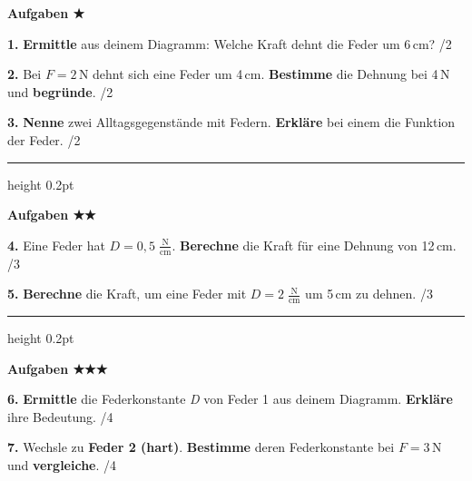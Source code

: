 \documentclass[10pt,a4paper]{article}
\newcommand{\punkte}[1]{\hfill\textcolor{grau}{\small/#1}}
\newcommand{\stern}[1]{\textcolor{physik}{\textbf{#1}}}
\newcommand{\fv}[1]{\textit{#1}}
\newcommand{\op}[1]{\textbf{#1}}
\newcommand{\rechenplatz}{\vspace{24mm}}
\begin{document}
\newpage

\textbf{\textcolor{physik}{Aufgaben \stern{★}}}

\vspace{3mm}

\textbf{1.} \op{Ermittle} aus deinem Diagramm: Welche Kraft dehnt die Feder um 6\,cm? \punkte{2}

\vspace{6mm}

\textbf{2.} Bei $\fv{F} = 2$\,N dehnt sich eine Feder um 4\,cm. \op{Bestimme} die Dehnung bei 4\,N und \op{begründe}. \punkte{2}

\vspace{10mm}

\textbf{3.} \op{Nenne} zwei Alltagsgegenstände mit Federn. \op{Erkläre} bei einem die Funktion der Feder. \punkte{2}

\vspace{12mm}

\hrule height 0.2pt
\vspace{4mm}

\textbf{\textcolor{physik}{Aufgaben \stern{★★}}}

\vspace{3mm}

\textbf{4.} Eine Feder hat $\fv{D} = 0{,}5\;\frac{\text{N}}{\text{cm}}$. \op{Berechne} die Kraft für eine Dehnung von 12\,cm. \punkte{3}

\rechenplatz

\textbf{5.} \op{Berechne} die Kraft, um eine Feder mit $\fv{D} = 2\;\frac{\text{N}}{\text{cm}}$ um 5\,cm zu dehnen. \punkte{3}

\rechenplatz

\hrule height 0.2pt
\vspace{4mm}

\textbf{\textcolor{physik}{Aufgaben \stern{★★★}}}

\vspace{3mm}

\textbf{6.} \op{Ermittle} die Federkonstante \fv{D} von Feder 1 aus deinem Diagramm. \op{Erkläre} ihre Bedeutung. \punkte{4}

\rechenplatz

\textbf{7.} Wechsle zu \textbf{Feder 2 (hart)}. \op{Bestimme} deren Federkonstante bei $\fv{F} = 3$\,N und \op{vergleiche}. \punkte{4}

\rechenplatz
\end{document}
